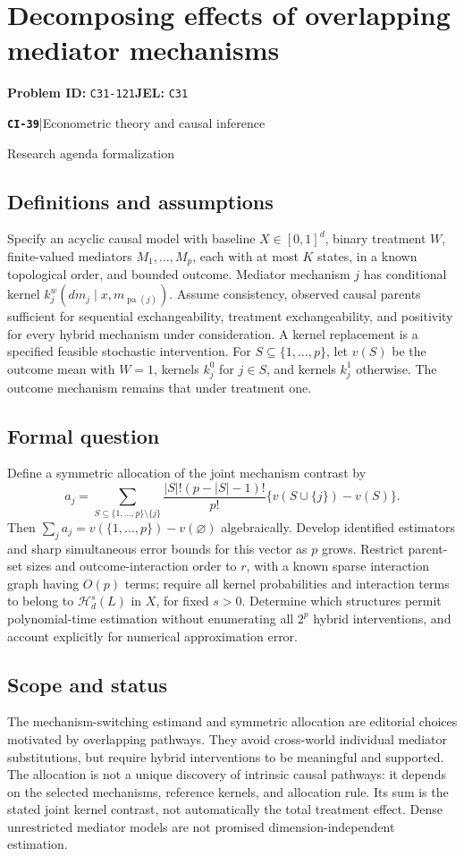 \documentclass[11pt,a4paper]{article}
\newcommand{\entrymeta}[3]{{\sffamily\small\color{muted}\textbf{\texttt{#1}}\quad|\quad #2\par #3\par}}
\begin{document}
\section*{Decomposing effects of overlapping mediator mechanisms}
\textbf{Problem ID:} \texttt{C31-121}\quad \textbf{JEL:} \texttt{C31}\par
\label{problem:OP-0518}
\label{beyond:CI-39}
\entrymeta{CI-39}{Econometric theory and causal inference}{Research agenda formalization}
\subsection*{Definitions and assumptions}
Specify an acyclic causal model with baseline $X\in[0,1]^d$, binary treatment $W$, finite-valued mediators $M_1,\ldots,M_p$, each with at most $K$ states, in a known topological order, and bounded outcome. Mediator mechanism $j$ has conditional kernel $k_j^w(dm_j\mid x,m_{\operatorname{pa}(j)})$. Assume consistency, observed causal parents sufficient for sequential exchangeability, treatment exchangeability, and positivity for every hybrid mechanism under consideration. A kernel replacement is a specified feasible stochastic intervention. For $S\subseteq\{1,\ldots,p\}$, let $v(S)$ be the outcome mean with $W=1$, kernels $k_j^0$ for $j\in S$, and kernels $k_j^1$ otherwise. The outcome mechanism remains that under treatment one.
\subsection*{Formal question}
Define a symmetric allocation of the joint mechanism contrast by
\[
 a_j=\sum_{S\subseteq\{1,\ldots,p\}\setminus\{j\}}
 \frac{|S|!(p-|S|-1)!}{p!}\{v(S\cup\{j\})-v(S)\}.
\]
Then $\sum_ja_j=v(\{1,\ldots,p\})-v(\varnothing)$ algebraically. Develop identified estimators and sharp simultaneous error bounds for this vector as $p$ grows. Restrict parent-set sizes and outcome-interaction order to $r$, with a known sparse interaction graph having $O(p)$ terms; require all kernel probabilities and interaction terms to belong to $\mathcal H_d^s(L)$ in $X$, for fixed $s>0$. Determine which structures permit polynomial-time estimation without enumerating all $2^p$ hybrid interventions, and account explicitly for numerical approximation error.
\subsection*{Scope and status}
The mechanism-switching estimand and symmetric allocation are editorial choices motivated by overlapping pathways. They avoid cross-world individual mediator substitutions, but require hybrid interventions to be meaningful and supported. The allocation is not a unique discovery of intrinsic causal pathways: it depends on the selected mechanisms, reference kernels, and allocation rule. Its sum is the stated joint kernel contrast, not automatically the total treatment effect. Dense unrestricted mediator models are not promised dimension-independent estimation.
\end{document}
